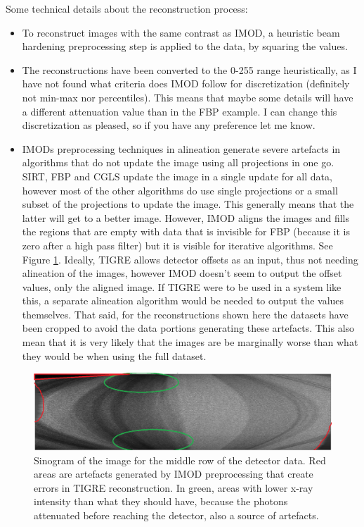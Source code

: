 \documentclass[11pt]{report}
\begin{document}
Some technical details about the reconstruction process:
\begin{itemize}
\item To reconstruct images with the same contrast as IMOD, a heuristic beam hardening preprocessing step is applied to the data, by squaring the values.
\item The reconstructions have been converted to the 0-255 range heuristically, as I have not found what criteria does IMOD follow for discretization (definitely not min-max nor percentiles). This means that maybe some details will have a different attenuation value than in the FBP example. I can change this discretization as pleased, so if you have any preference let me know.

\item IMODs preprocessing techniques in alineation generate severe artefacts in algorithms that do not update the image using all projections in one go. SIRT, FBP and CGLS update the image in a single update for all data, however most of the other algorithms do use single projections or a small subset of the projections to update the image. This generally means that the latter will get to a better image. However, IMOD aligns the images and fills the regions that are empty with data that is invisible for FBP (because it is zero after a high pass filter) but it is visible for iterative algorithms. See Figure \ref{fig:sino}. Ideally, TIGRE allows detector offsets as an input, thus not needing alineation of the images, however IMOD doesn't seem to output the offset values, only the aligned image. If TIGRE were to be used in a system like this, a separate alineation algorithm would be needed to output the values themselves. That said, for the reconstructions shown here the datasets have been cropped to avoid the data portions generating these artefacts. This also mean that it is very likely that the images are be marginally worse than what they would be when using the full dataset.
\end{itemize}

\begin{figure}
\begin{center}

\includegraphics[width=\textwidth]{sinogram.png} 


\end{center}

\caption{\label{fig:sino} Sinogram of the image for the middle row of the detector data. Red areas are artefacts generated by IMOD preprocessing that create errors in TIGRE reconstruction. In green, areas with lower x-ray intensity than what they should have, because the photons attenuated before reaching the detector, also a source of artefacts.} 
\end{figure}
\end{document}
